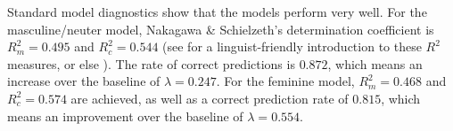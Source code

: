 \documentclass[USenglish]{article}
\begin{document}

Standard model diagnostics show that the models perform very well.
For the masculine\slash neuter model, Nakagawa \& Schielzeth's determination coefficient is $R_m^2=0.495$ and $R^2_c=0.544$ (see \citealp{Gries2015} for a linguist-friendly introduction to these $R^2$ measures, or else \citealp{NakagawaSchielzeth2013}).
The rate of correct predictions is $0.872$, which means an increase over the baseline of $\lambda=0.247$.
For the feminine model, $R_m^2=0.468$ and $R^2_c=0.574$ are achieved, as well as a correct prediction rate of $0.815$, which means an improvement over the baseline of $\lambda=0.554$.
\end{document}

